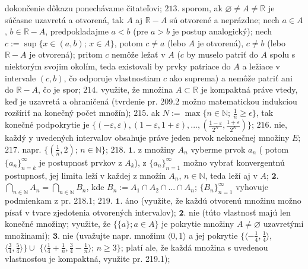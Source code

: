dokončenie dôkazu ponechávame čitateľovi;
$\boxed{213.}$ sporom, ak $\varnothing \ne A \ne \mathbb{R}$ je súčasne uzavretá a otvorená, tak $ A $ aj $ \mathbb{R} -A $ sú otvorené a neprázdne; nech $ a \in A $, $b \in \mathbb{R} - A$, predpokladajme $ a<b $ (pre $ a>b $ je postup analogický); nech $ c:= \sup \lbrace x \in (a,b); \, x \in A \rbrace $, potom $ c \ne a $  (lebo  $ A $  je otvorená), $ c \ne b$  (lebo  $\mathbb{R} - A $  je otvorená); pritom  $ c  $ nemôže ležať v $ A $ ($ c $ by muselo patriť do $ A $  spolu s niektorým svojim okolím, teda existovali by prvky patriace do $ A $  a ležiace v intervale $ (c,b) $, čo odporuje vlastnostiam $ c $  ako suprema) a nemôže patriť ani do $\mathbb{R} - A $, čo je spor; 
$\boxed{214.}$ využite, že množina $A \subset \mathbb{R}$ je kompaktná práve vtedy, keď je uzavretá a ohraničená (tvrdenie pr. 209.2 možno matematickou indukciou rozšíriť na konečný počet množín);
$\boxed{215.}$ ak $N:= \max \lbrace n \in \mathbb{N};\, \frac{1}{n} \geq \epsilon \rbrace $, tak konečné podpokrytie je $\lbrace (-\varepsilon , \varepsilon),  ( 1- \varepsilon , 1+ \varepsilon),..., (\frac{1-\varepsilon}{2^{N}},\frac{1+\varepsilon}{2^{N}}) \rbrace$;
$\boxed{216.}$ nie, každý y uvedených intervalov obsahuje práve jeden prvok nekonečnej množiny $E$;
$\boxed{217.}$ napr. $\lbrace ( \frac{1}{n},2);\, n \in \mathbb{N} \rbrace $;
$\boxed{218.}$ $\boldsymbol{1.}$ z množiny $A_{n}$ vyberme prvok $a_{n}$ ( potom $\lbrace a_{n} \rbrace _{n=k}  ^{\infty}$ je postupnosť prvkov z  $A_{k}$), z $\lbrace a_{n} \rbrace _{n=1}  ^{\infty}$ možno vybrať konvergentnú postupnosť, jej limita leží v každej z množín  $A_{n}$, $ n \in \mathbb{N}$, teda leží aj v $ A $;
$\boldsymbol{2.}$ $\bigcap\limits_{n \in \mathbb{N}} A_{n} = \bigcap\limits_{n \in \mathbb{N}} B_{n}$, kde $B_{n}:= A_{1}\cap A_{2}\cap ... \cap A_{n}$;  $\lbrace B_{n} \rbrace _{n=1}  ^{\infty}$ vyhovuje podmienkam z pr. 218.1;
$\boxed{219.}$ $\boldsymbol{1.}$ áno (využite, že každú otvorenú množinu možno písať v tvare zjedotenia otvorených intervalov);
$\boldsymbol{2.}$ nie (túto vlastnosť majú len konečné množiny; využite, že $\lbrace \lbrace a \rbrace;a \in A \rbrace$  je pokrytie množiny $A \ne \varnothing $  uzavretými množinami);
$\boldsymbol{3.}$ nie (uvažujte napr. množinu $\langle 0,1\rangle $ a jej pokrytie $\lbrace \langle -\frac{1}{4}, \frac{1}{4} \rangle$, $\langle \frac{3}{4}, \frac{5}{4} \rangle \rbrace \cup $ $\lbrace \langle \frac{1}{4} +\frac{1}{n} , \frac{3}{4} - \frac{1}{n} \rangle$; $n\geq 3 \rbrace $; platí ale, že každá množina s uvedenou vlastnosťou je kompaktná, využite pr. 219.1);
